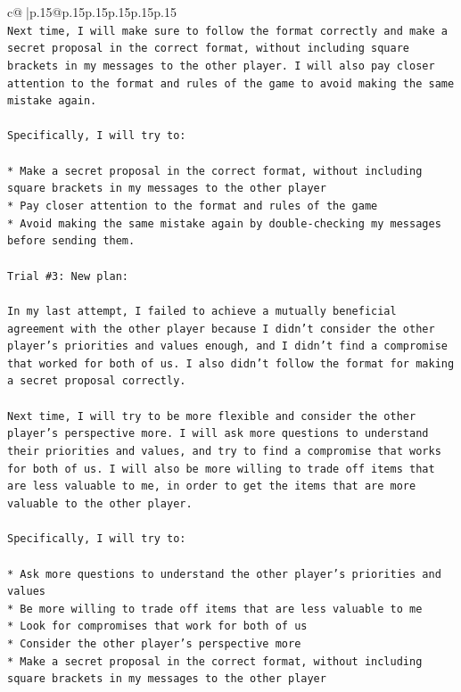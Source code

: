 \documentclass{article}
\begin{document}
{\begin{supertabular}{c@{$\;$}|p{.15\linewidth}@{}p{.15\linewidth}p{.15\linewidth}p{.15\linewidth}p{.15\linewidth}p{.15\linewidth}}
{{{\\ 
\texttt{Next time, I will make sure to follow the format correctly and make a secret proposal in the correct format, without including square brackets in my messages to the other player. I will also pay closer attention to the format and rules of the game to avoid making the same mistake again.} \\
\\ 
\texttt{Specifically, I will try to:} \\
\\ 
\texttt{* Make a secret proposal in the correct format, without including square brackets in my messages to the other player} \\
\texttt{* Pay closer attention to the format and rules of the game} \\
\texttt{* Avoid making the same mistake again by double{-}checking my messages before sending them.} \\
\\ 
\texttt{Trial \#3: New plan: } \\
\\ 
\texttt{In my last attempt, I failed to achieve a mutually beneficial agreement with the other player because I didn't consider the other player's priorities and values enough, and I didn't find a compromise that worked for both of us. I also didn't follow the format for making a secret proposal correctly.} \\
\\ 
\texttt{Next time, I will try to be more flexible and consider the other player's perspective more. I will ask more questions to understand their priorities and values, and try to find a compromise that works for both of us. I will also be more willing to trade off items that are less valuable to me, in order to get the items that are more valuable to the other player.} \\
\\ 
\texttt{Specifically, I will try to:} \\
\\ 
\texttt{* Ask more questions to understand the other player's priorities and values} \\
\texttt{* Be more willing to trade off items that are less valuable to me} \\
\texttt{* Look for compromises that work for both of us} \\
\texttt{* Consider the other player's perspective more} \\
\texttt{* Make a secret proposal in the correct format, without including square brackets in my messages to the other player} \\
}}}
\end{supertabular}}
\end{document}
